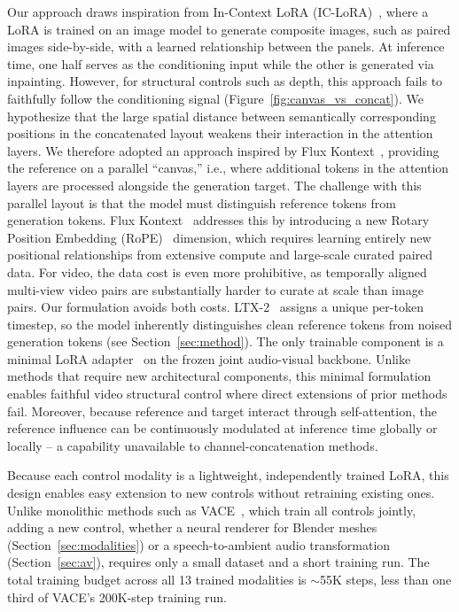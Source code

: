 Our approach draws inspiration from In-Context LoRA (IC-LoRA)~\cite{huang2024iclora}, where a LoRA is trained on an image model to generate composite images, such as paired images side-by-side, with a learned relationship between the panels. At inference time, one half serves as the conditioning input while the other is generated via inpainting.
However, for structural controls such as depth, this approach fails to faithfully follow the conditioning signal (Figure~\ref{fig:canvas_vs_concat}). We hypothesize that the large spatial distance between semantically corresponding positions in the concatenated layout weakens their interaction in the attention layers.
We therefore adopted an approach inspired by Flux Kontext~\cite{batifol2025fluxkontext}, providing the reference on a parallel ``canvas,'' i.e., where additional tokens in the attention layers are processed alongside the generation target.
The challenge with this parallel layout is that the model must distinguish reference tokens from generation tokens. Flux Kontext~\cite{batifol2025fluxkontext} addresses this by introducing a new Rotary Position Embedding (RoPE)~\cite{su2021rope} dimension, which requires learning entirely new positional relationships from extensive compute and large-scale curated paired data. For video, the data cost is even more prohibitive, as temporally aligned multi-view video pairs are substantially harder to curate at scale than image pairs.
Our formulation avoids both costs. LTX-2~\cite{hacohen2026ltx2} assigns a unique per-token timestep, so the model inherently distinguishes clean reference tokens from noised generation tokens (see Section~\ref{sec:method}). The only trainable component is a minimal LoRA adapter~\cite{hu2022lora} on the frozen joint audio-visual backbone. Unlike methods that require new architectural components, this minimal formulation enables faithful video structural control where direct extensions of prior methods fail.
Moreover, because reference and target interact through self-attention, the reference influence can be continuously modulated at inference time globally or locally -- a capability unavailable to channel-concatenation methods.

Because each control modality is a lightweight, independently trained LoRA, this design enables easy extension to new controls without retraining existing ones. Unlike monolithic methods such as VACE~\cite{jiang2025vace}, which train all controls jointly, adding a new control, whether a neural renderer for Blender meshes (Section~\ref{sec:modalities}) or a speech-to-ambient audio transformation (Section~\ref{sec:av}), requires only a small dataset and a short training run. The total training budget across all 13 trained modalities is ${\sim}$55K steps, less than one third of VACE's 200K-step training run.


